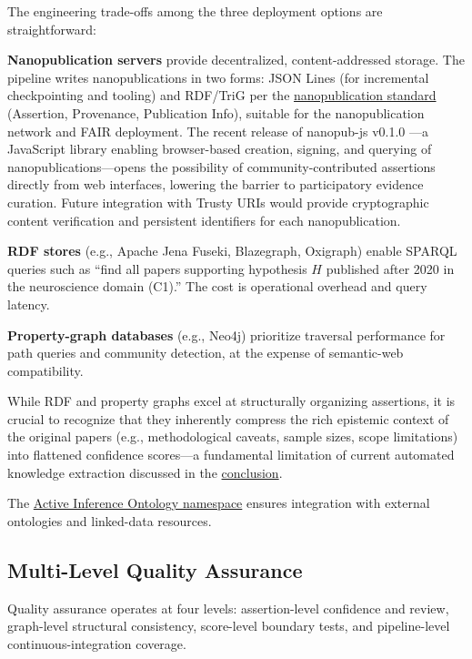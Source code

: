 \documentclass[
  english,
]{article}
\begin{document}
{{{{{{{{{{{{{{{{The engineering trade-offs among the three deployment options are
straightforward:

\textbf{Nanopublication servers} provide decentralized,
content-addressed storage. The pipeline writes nanopublications in two
forms: JSON Lines (for incremental checkpointing and tooling) and
RDF/TriG per the \href{https://nanopub.net/}{nanopublication standard}
(Assertion, Provenance, Publication Info), suitable for the
nanopublication network and FAIR deployment. The recent release of
nanopub-js v0.1.0 \citep{kuhn2026nanopubjs}---a JavaScript library
enabling browser-based creation, signing, and querying of
nanopublications---opens the possibility of community-contributed
assertions directly from web interfaces, lowering the barrier to
participatory evidence curation. Future integration with Trusty URIs
\citep{kuhn2014trusty} would provide cryptographic content verification
and persistent identifiers for each nanopublication.

\textbf{RDF stores} (e.g., Apache Jena Fuseki, Blazegraph, Oxigraph)
enable SPARQL queries such as ``find all papers supporting hypothesis
\(H\) published after 2020 in the neuroscience domain (C1).'' The cost
is operational overhead and query latency.

\textbf{Property-graph databases} (e.g., Neo4j) prioritize traversal
performance for path queries and community detection, at the expense of
semantic-web compatibility.

While RDF and property graphs excel at structurally organizing
assertions, it is crucial to recognize that they inherently compress the
rich epistemic context of the original papers (e.g., methodological
caveats, sample sizes, scope limitations) into flattened confidence
scores---a fundamental limitation of current automated knowledge
extraction discussed in the \hyperref[sec:conclusion]{conclusion}.

The \href{http://activeinference.institute/ontology/}{Active Inference
Ontology namespace} ensures integration with external ontologies and
linked-data resources.

\subsection{Multi-Level Quality
Assurance}\label{multi-level-quality-assurance}

Quality assurance operates at four levels: assertion-level confidence
and review, graph-level structural consistency, score-level boundary
tests, and pipeline-level continuous-integration coverage.

}}}}}}}}}}}}}}}}
\end{document}
